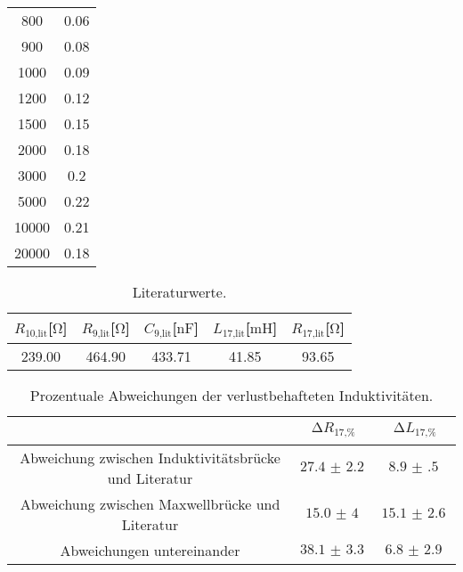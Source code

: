 \begin{table}
\begin{tabular}{c c}
                800   &   0.06 \\          
                900   &   0.08 \\           
                1000  &   0.09 \\              
                1200  &   0.12 \\             
                1500  &   0.15 \\             
                2000  &   0.18 \\             
                3000  &   0.2 \\              
                5000  &   0.22 \\             
                10000 &   0.21 \\              
                20000 &   0.18 \\       
                \bottomrule
            \end{tabular}
            \end{table}

            \begin{table}
                \centering
                \caption{Literaturwerte.}
                \label{tab:lit}
                \begin{tabular}{c c c c c}
                    \toprule
                    $R_{10\text{,lit}}$[$\si{\ohm}$] & $R_{9\text{,lit}}$[$\si{\ohm}$] & $C_{9\text{,lit}}$[$\si{\nano\farad}$] & $L_{17\text{,lit}}$[$\si{\milli\henry}$] &$R_{17\text{,lit}}$[$\si{\ohm}$]\\
                    \midrule
                    239.00 & 464.90 & 433.71 & 41.85 & 93.65 \\
                    \bottomrule
                \end{tabular}
                \end{table}

                \begin{table}
                    \centering
                    \caption{Prozentuale Abweichungen der verlustbehafteten Induktivitäten.}
                    \label{tab:hello}
                    \begin{tabular}{c c c }
                        \toprule
                        ~ & $\increment R_{17{\text{,}}\si{\percent}}$ & $\increment L_{17{\text{,}}\si{\percent}}$ \\
                        \midrule
                        Abweichung zwischen Induktivitätsbrücke und Literatur & $\SI{27.4(22)}{}$ & $\SI{8.9(5)}{}$ \\
                        Abweichung zwischen Maxwellbrücke und Literatur & $\SI{15.0(40)}{}$ & $\SI{15.1(26)}{}$ \\
                        Abweichungen untereinander & $\SI{38.1(33)}{}$ & $\SI{6.8(29)}{}$ \\
                        \bottomrule
                    \end{tabular}
                    \end{table}